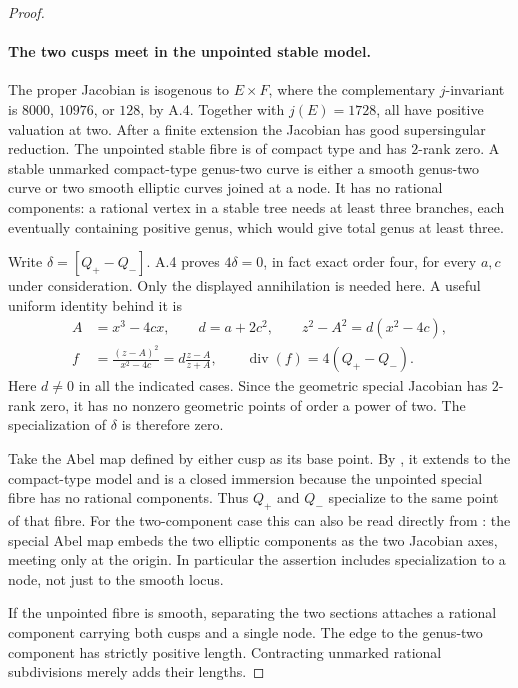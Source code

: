\begin{proof}
\paragraph{The two cusps meet in the unpointed stable model.}
The proper Jacobian is isogenous to \(E\times F\),
where the complementary \(j\)-invariant is \(8000\),
\(10976\), or \(128\), by A.4. Together with
\(j(E)=1728\), all have positive valuation at two.
After a finite extension the Jacobian has good
supersingular reduction. The unpointed stable fibre
is of compact type and has \(2\)-rank zero.
A stable unmarked compact-type genus-two curve is
either a smooth genus-two curve or two smooth
elliptic curves joined at a node. It has no rational
components: a rational vertex in a stable tree needs
at least three branches, each eventually containing
positive genus, which would give total genus at
least three.

Write \(\delta=[Q_+-Q_-]\). A.4 proves
\(4\delta=0\), in fact exact order four, for every
\(a,c\) under consideration. Only the displayed
annihilation is needed here. A useful uniform
identity behind it is
\[
 \begin{aligned}
 A&=x^3-4cx,\qquad d=a+2c^2,\qquad
 z^2-A^2=d(x^2-4c),\\
 f&=\frac{(z-A)^2}{x^2-4c}=d\frac{z-A}{z+A},\qquad
 \operatorname{div}(f)=4(Q_+-Q_-).
 \end{aligned}                                      \tag{A.39.2}
\]
Here \(d\ne0\) in all the indicated cases.
Since the geometric special Jacobian has \(2\)-rank
zero, it has no nonzero geometric points of order
a power of two. The specialization of \(\delta\)
is therefore zero.

Take the Abel map defined by either cusp as its
base point. By
\cite[Theorem 1.1]{fghDupuyRabinoff}, it extends to
the compact-type model and is a closed immersion
because the unpointed special fibre has no rational
components. Thus \(Q_+\) and \(Q_-\) specialize to
the same point of that fibre. For the two-component
case this can also be read directly from
\cite[Proposition 3.2]{fghDupuyRabinoff}: the special
Abel map embeds the two elliptic components as the
two Jacobian axes, meeting only at the origin.
In particular the assertion includes specialization
to a node, not just to the smooth locus.

If the unpointed fibre is smooth, separating the two
sections attaches a rational component carrying both
cusps and a single node. The edge to the genus-two
component has strictly positive length. Contracting
unmarked rational subdivisions merely adds their
lengths.


\end{proof}
